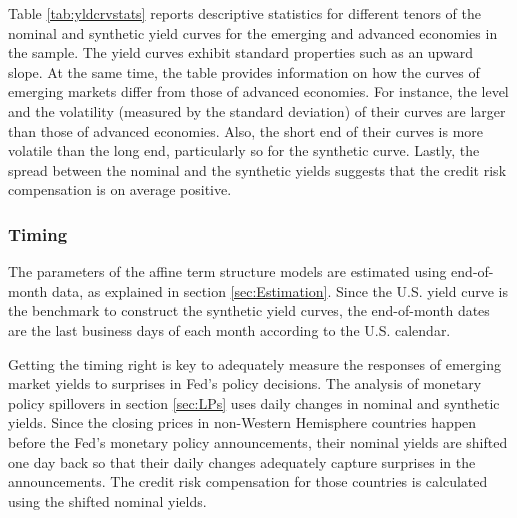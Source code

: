 {Table \ref{tab:yldcrvstats} reports descriptive statistics for different tenors of the nominal and synthetic yield curves for the emerging and advanced economies in the sample. 
The yield curves exhibit standard properties such as an 
upward slope.
At the same time, the table provides information on how the curves of emerging markets differ from those of advanced economies. 
For instance, the level and the volatility (measured by the standard deviation) of their curves %
are larger than those of advanced economies.
Also, the short end of their curves is more volatile than the long end, particularly so for the synthetic curve.
Lastly, the spread between the nominal and the synthetic yields suggests that the credit risk compensation is on average positive. %




\subsubsection{Timing}
The parameters of the affine term structure models are estimated using end-of-month data, as explained in section \ref{sec:Estimation}.
Since the U.S. yield curve is the benchmark to construct the synthetic yield curves, the end-of-month dates are the last business days of each month according to the U.S. calendar.

Getting the timing right is key to adequately measure the responses of emerging market yields to surprises in Fed's policy decisions.
The analysis of monetary policy spillovers in section \ref{sec:LPs} uses daily changes in nominal and synthetic yields. %
Since the closing prices in non-Western Hemisphere countries happen before the Fed's monetary policy announcements, 
their nominal yields are shifted one day back 
so that their daily changes adequately capture surprises in the announcements.
The credit risk compensation for those countries is calculated using the shifted nominal yields.

}
